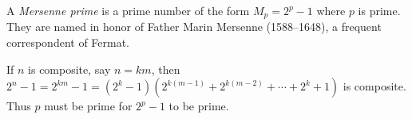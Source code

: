 A \textit{Mersenne prime} is a prime number of the form $M_p = 2^p - 1$ where $p$ is prime. They are named in honor of Father Marin Mersenne (1588--1648), a frequent correspondent of Fermat.

If $n$ is composite, say $n = km$, then $2^n - 1 = 2^{km} - 1 = (2^k - 1)(2^{k(m-1)} + 2^{k(m-2)} + \cdots + 2^k + 1)$ is composite. Thus $p$ must be prime for $2^p - 1$ to be prime.
